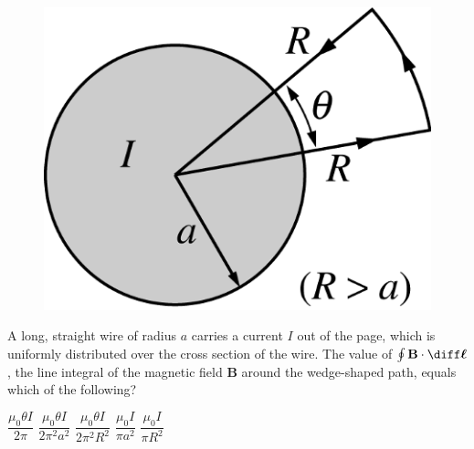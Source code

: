 \begin{figure}[H]
    \center
    \includegraphics[scale=0.25]{images/img-013-025.png}
\end{figure}

\begin{questions}\setcounter{question}{34}\question
A long, straight wire of radius $a$ carries a current $I$ out of the page, which is uniformly distributed over the cross section of the wire. The value of $\oint \mathbf{B} \cdot \diff \boldsymbol{\ell}$, the line integral of the magnetic field
$\mathbf{B}$ around the wedge-shaped path, equals which of the following?

\begin{oneparchoices}
\choice $\dfrac{\mu_{0} \theta I}{2 \pi}$
\choice $\dfrac{\mu_{0} \theta I}{2 \pi^{2} a^{2}}$
\choice $\dfrac{\mu_{0} \theta I}{2 \pi^{2} R^{2}}$
\choice $\dfrac{\mu_{0} I}{\pi a^{2}}$
\choice $\dfrac{\mu_{0} I}{\pi R^{2}}$
\end{oneparchoices}\end{questions}

